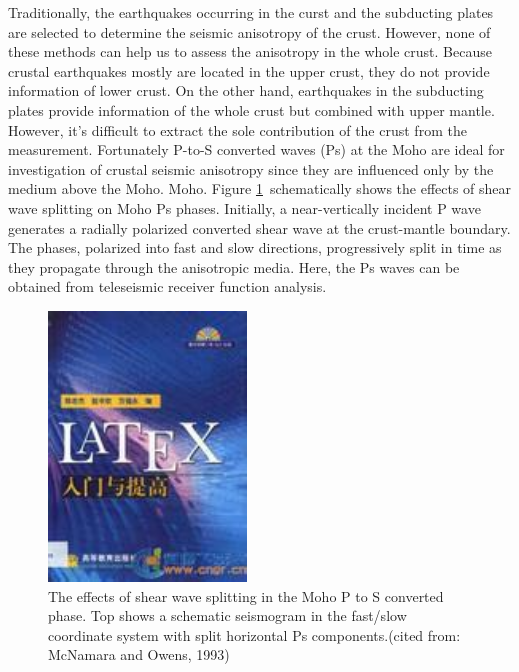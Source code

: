 \documentclass{article}
\begin{document}
Traditionally, the earthquakes occurring in the curst and the subducting plates are selected to determine the seismic anisotropy of the crust. However, none of these methods can help us to assess the anisotropy in the whole crust.  Because crustal earthquakes mostly are located in the upper crust, they do not provide information of lower crust. On the other hand, earthquakes in the subducting plates provide information of the whole crust but combined with upper mantle. However, it’s difficult to extract the sole contribution of the crust from the measurement. Fortunately P-to-S converted waves (Ps) at the Moho are ideal for investigation of crustal seismic anisotropy since they are influenced only by the medium above the Moho. Moho. Figure \ref{crustalspliting}~schematically shows the effects of shear wave splitting on Moho Ps phases. Initially, a near-vertically incident P wave generates a radially polarized converted shear wave at the crust-mantle boundary. The phases, polarized into fast and slow directions, progressively split in time as they propagate through the anisotropic media. Here, the Ps waves can be obtained from teleseismic receiver function analysis. 
%
%
\begin{figure}[htbp]
\begin{center}
\includegraphics[width=0.47\textwidth]{crustalsplit.jpg}
\caption{The effects of shear wave splitting in the Moho P to S converted phase. Top shows a schematic seismogram in the fast/slow coordinate system with split horizontal Ps components.(cited from: McNamara and Owens, 1993)}
\label{crustalspliting}
\end{center}
\end{figure}
%
%
\end{document}
